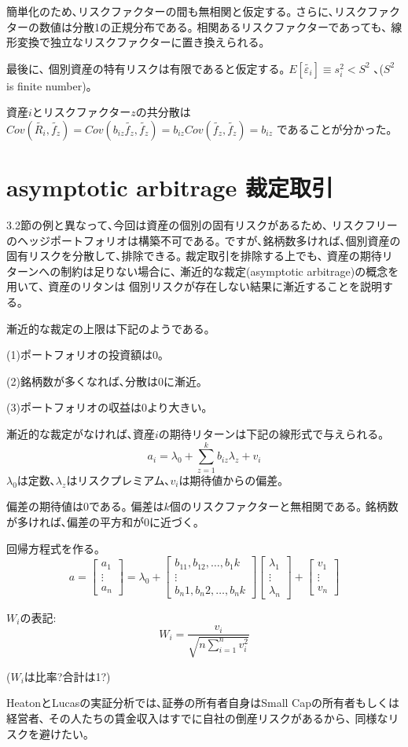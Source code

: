 \documentclass[uplatex,a4paper]{jsarticle}
\begin{document}
簡単化のため､リスクファクターの間も無相関と仮定する｡
さらに､リスクファクターの数値は分散1の正規分布である｡
{\color{red}相関あるリスクファクターであっても､ 線形変換で独立なリスクファクターに置き換えられる｡}

最後に､
個別資産の特有リスクは有限であると仮定する｡
$
E[\tilde{\varepsilon_i}] \equiv s_i^2 < S^2
$
､($ S^2 $ is finite number)｡

資産$i$とリスクファクター$z$の共分散は
$
Cov(\tilde{R_i},\tilde{f_z}) = Cov(b_{iz} \tilde{f_z}, \tilde{f_z}) = b_{iz} Cov(\tilde{f_z}, \tilde{f_z}) = b_{iz}
$
であることが分かった｡

\section{asymptotic arbitrage  裁定取引}

3.2節の例と異なって､今回は資産の個別の固有リスクがあるため､
リスクフリーのヘッジポートフォリオは構築不可である｡
ですが､銘柄数多ければ､個別資産の固有リスクを分散して､排除できる｡
{\color{red}裁定取引を排除する上でも､ 資産の期待リターンへの制約は足りない場合に､
漸近的な裁定(asymptotic arbitrage)の概念を用いて､
資産のリタンは 個別リスクが存在しない結果に漸近することを説明する｡
}

漸近的な裁定の上限は下記のようである｡

(1)ポートフォリオの投資額は0｡

(2)銘柄数が多くなれば､分散は0に漸近｡

(3)ポートフォリオの収益は0より大きい｡


漸近的な裁定がなければ､資産$i$の期待リターンは下記の線形式で与えられる｡
$$
a_i = \lambda_0 + \sum_{z=1}^{k} b_{iz} \lambda_z + v_i
$$
$\lambda_0$は定数､$\lambda_z$はリスクプレミアム､$v_i$は期待値からの偏差｡

偏差の期待値は0である｡
偏差は$k$個のリスクファクターと無相関である｡
銘柄数が多ければ､偏差の平方和が0に近づく｡

回帰方程式を作る｡
$$
a = \begin{bmatrix}
    a_1 \\
    \vdots \\
    a_n
    \end{bmatrix}
= \lambda_0 +
\begin{bmatrix}
    b_11, b_12, \hdots, b_1k \\
    \vdots \\
    b_n1, b_n2, \hdots, b_nk
\end{bmatrix}
\begin{bmatrix}
    \lambda_1 \\
    \vdots \\
    \lambda_n
\end{bmatrix}
+
\begin{bmatrix}
    v_1 \\
    \vdots \\
    v_n
\end{bmatrix}
$$

$W_i$の表記:
$$
W_i = \frac{v_i}{\sqrt{n \sum_{i=1}^{n} v_i^2}}
$$

{\color{red}
($W_i$は比率?合計は1?)
}


{\color{red}
HeatonとLucasの実証分析では､証券の所有者自身はSmall Capの所有者もしくは経営者､
その人たちの賃金収入はすでに自社の倒産リスクがあるから､
同様なリスクを避けたい｡
}
\end{document}
